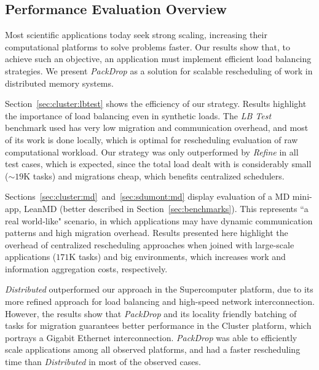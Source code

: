 \subsection{Performance Evaluation Overview} \label{eval:overview}

Most scientific applications today seek strong scaling, increasing their computational platforms to solve problems faster.
Our results show that, to achieve such an objective, an application must implement efficient load balancing strategies.
We present \textit{PackDrop} as a solution for scalable rescheduling of work in distributed memory systems.

Section~\ref{sec:cluster:lbtest} shows the efficiency of our strategy. 
Results highlight the importance of load balancing even in synthetic loads.
The \textit{LB Test} benchmark used has very low migration and communication overhead, and most of its work is done locally, which is optimal for rescheduling evaluation of raw computational workload.
Our strategy was only outperformed by \textit{Refine} in all test cases, which is expected, since the total load dealt with is considerably small ($\sim 19$K tasks) and migrations cheap, which benefits centralized schedulers.

Sections~\ref{sec:cluster:md}~and~\ref{sec:sdumont:md} display evaluation of a MD mini-app, LeanMD (better described in Section~\ref{sec:benchmarks}).
This represents ``a real world-like" scenario, in which applications may have dynamic communication patterns and high migration overhead.
Results presented here highlight the overhead of centralized rescheduling approaches when joined with large-scale applications ($171$K tasks) and big environments, which increases work and information aggregation costs, respectively.

\textit{Distributed} outperformed our approach in the Supercomputer platform, due to its more refined approach for load balancing and high-speed network interconnection.
However, the results show that \textit{PackDrop} and its locality friendly batching of tasks for migration guarantees better performance in the Cluster platform, which portrays a Gigabit Ethernet interconnection.
\textit{PackDrop} was able to efficiently scale applications among all observed platforms, and had a faster rescheduling time than \textit{Distributed} in most of the observed cases.

